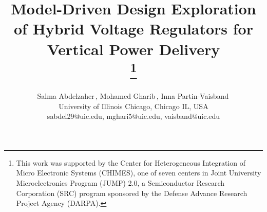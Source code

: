 \documentclass[conference]{IEEEtran}
\begin{document}
\title{Model-Driven Design Exploration of Hybrid Voltage Regulators for Vertical Power Delivery\\
\thanks{This work was supported by the Center for Heterogeneous Integration of Micro Electronic Systems (CHIMES), one of seven centers in Joint University Microelectronics Program (JUMP) 2.0, a Semiconductor Research Corporation (SRC) program sponsored by the Defense Advance Research Project Agency (DARPA).}
}


\author{
\begin{minipage}[t]{\linewidth}
    \centering
    Salma Abdelzaher\,,\;
    Mohamed Gharib\,,\;
    Inna Partin-Vaisband\, \\
    University of Illinois Chicago, Chicago IL, USA \\
    sabdel29@uic.edu, mghari5@uic.edu, vaisband@uic.edu
\end{minipage}
\hfill
}


\maketitle
\end{document}

